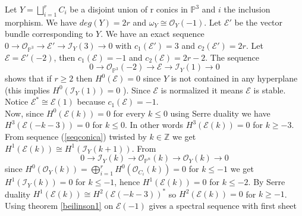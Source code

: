 \documentclass[
	oldfontcommands,
	sumario=abnt-6027-2012,
	12pt,			%
	openright,		%
	oneside,		%
	a4paper,		%
	english,		%
	brazil			%
	]{imecc-unicamp}
\begin{document}
\begin{example}\label{exemplobeilinson}
Let $Y=\bigsqcup_{i=1}^r C_i$ be a disjoint union of r conics in $\mathbb{P}^3$ and $i$ the inclusion morphism. We have $deg(Y)=2r$ and $ \omega_Y \cong  \mathcal{O}_Y(-1)$. Let $\mathcal{E}'$ be the vector bundle corresponding to $Y$. We have an exact sequence $0 \to \mathcal{O}_{\mathbb{P}^3} \to \mathcal{E'} \to \mathcal{I}_Y(3) \to 0$ with $c_1(\mathcal{E'})=3$ and $c_2(\mathcal{E'})=2r$. Let $\mathcal{E}=\mathcal{E'}(-2)$, then $c_1(\mathcal{E})=-1$ and $c_2(\mathcal{E})=2r-2$. The sequence
\begin{equation}\label{seqconica}
0 \to \mathcal{O}_{\mathbb{P}^3}(-2) \to \mathcal{E} \to \mathcal{I}_Y(1) \to 0
\end{equation}
shows that if $r \geq 2$ then $H^0(\mathcal{E})=0$ since $Y$ is not contained in any hyperplane (this implies $H^0(\mathcal{I}_Y(1))=0$ ). Since $\mathcal{E}$ is normalized it means $\mathcal{E}$ is stable. Notice $\mathcal{E}^* \cong \mathcal{E}(1)$ because $c_1(\mathcal{E})=-1$.\\
Now, since $H^0(\mathcal{E}(k))=0$ for every $k \leq 0$ using Serre duality we have $H^3(\mathcal{E}(-k-3))=0$ for $k \leq 0$. In other words $H^3(\mathcal{E}(k))=0$ for $k \geq -3$.\\
From sequence (\ref{seqconica}) twisted by $k \in \mathbb{Z}$ we get $H^1(\mathcal{E}(k)) \cong H^1(\mathcal{I}_Y(k+1))$. From $$0 \to \mathcal{I}_Y(k) \to \mathcal{O}_{\mathbb{P}^n}(k) \to \mathcal{O}_Y(k) \to 0$$ since $H^0(\mathcal{O}_Y(k))=\bigoplus_{i=1}^r H^0(\mathcal{O}_{C_i}(k))=0$ for $k \leq -1$ we get $H^1(\mathcal{I}_Y(k))=0$ for $k \leq -1$, hence $H^1(\mathcal{E}(k))=0$ for $k \leq -2$. By Serre duality $H^1(\mathcal{E}(k)) \cong H^2(\mathcal{E}(-k-3))^*$ so $H^2(\mathcal{E}(k))=0$ for $k \geq -1$.\\
\iffalse
Using theorem \ref{beilinson1} on $\mathcal{E}(-1)$ gives a spectral sequence with first sheet
\begin{center}
\end{center}
\end{example}
\end{document}
